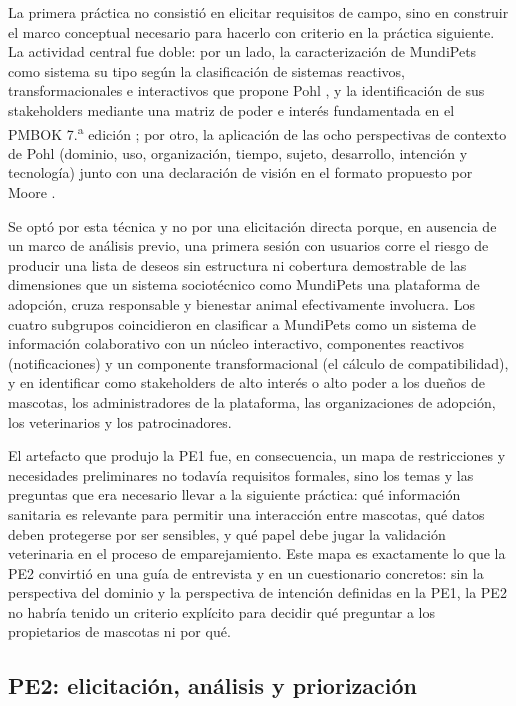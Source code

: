 \documentclass[journal,onecolumn]{IEEEtran}
\begin{document}
	La primera práctica no consistió en elicitar requisitos de campo, sino en construir el
	marco conceptual necesario para hacerlo con criterio en la práctica siguiente. La actividad
	central fue doble: por un lado, la caracterización de MundiPets como sistema  su tipo
	según la clasificación de sistemas reactivos, transformacionales e interactivos que
	propone Pohl \cite{pohl2025}, y la identificación de sus stakeholders mediante una matriz
	de poder e interés fundamentada en el PMBOK 7.\textsuperscript{a} edición \cite{pmbok7};
	por otro, la aplicación de las ocho perspectivas de contexto de Pohl (dominio, uso,
	organización, tiempo, sujeto, desarrollo, intención y tecnología) junto con una declaración
	de visión en el formato propuesto por Moore \cite{pohl2025}. 
	
	Se optó por esta técnica y no
	por una elicitación directa porque, en ausencia de un marco de análisis previo, una primera
	sesión con usuarios corre el riesgo de producir una lista de deseos sin estructura ni
	cobertura demostrable de las dimensiones que un sistema sociotécnico como MundiPets
	una plataforma de adopción, cruza responsable y bienestar animal efectivamente
	involucra. Los cuatro subgrupos coincidieron en clasificar a MundiPets como un sistema de
	información colaborativo con un núcleo interactivo, componentes reactivos (notificaciones)
	y un componente transformacional (el cálculo de compatibilidad), y en identificar como
	stakeholders de alto interés o alto poder a los dueños de mascotas, los administradores de
	la plataforma, las organizaciones de adopción, los veterinarios y los patrocinadores.
	
	El artefacto que produjo la PE1 fue, en consecuencia, un mapa de restricciones y
	necesidades preliminares no todavía requisitos formales, sino los temas y las preguntas
	que era necesario llevar a la siguiente práctica: qué información sanitaria es relevante
	para permitir una interacción entre mascotas, qué datos deben protegerse por ser sensibles,
	y qué papel debe jugar la validación veterinaria en el proceso de emparejamiento. Este mapa
	es exactamente lo que la PE2 convirtió en una guía de entrevista y en un cuestionario
	concretos: sin la perspectiva del dominio y la perspectiva de intención definidas en la
	PE1, la PE2 no habría tenido un criterio explícito para decidir qué preguntar a los
	propietarios de mascotas ni por qué.
	
	\subsection{PE2: elicitación, análisis y priorización}
	
\end{document}
